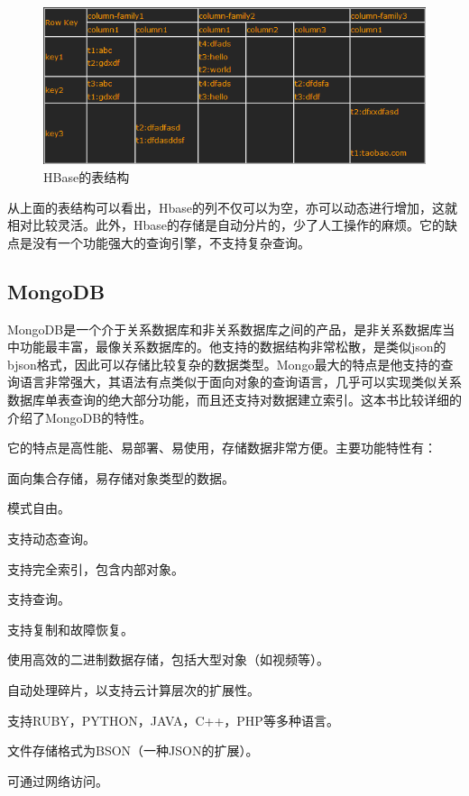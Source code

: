 \begin{figure}[!ht]
\centering
\includegraphics[]{photo/hbaseTable.PNG} 
\caption{HBase的表结构}
\end{figure} 

  从上面的表结构可以看出，Hbase的列不仅可以为空，亦可以动态进行增加，这就相对比较灵活。此外，Hbase的存储是自动分片的，少了人工操作的麻烦。它的缺点是没有一个功能强大的查询引擎，不支持复杂查询。

\subsection{MongoDB}
MongoDB是一个介于关系数据库和非关系数据库之间的产品，是非关系数据库当中功能最丰富，最像关系数据库的。他支持的数据结构非常松散，是类似json的bjson格式，因此可以存储比较复杂的数据类型。Mongo最大的特点是他支持的查询语言非常强大，其语法有点类似于面向对象的查询语言，几乎可以实现类似关系数据库单表查询的绝大部分功能，而且还支持对数据建立索引。\cite{MongoDBGuide}这本书比较详细的介绍了MongoDB的特性。

它的特点是高性能、易部署、易使用，存储数据非常方便。主要功能特性有：
\begin{compactitem}
\item 面向集合存储，易存储对象类型的数据。
\item 模式自由。
\item 支持动态查询。
\item 支持完全索引，包含内部对象。
\item 支持查询。
\item 支持复制和故障恢复。
\item 使用高效的二进制数据存储，包括大型对象（如视频等）。
\item 自动处理碎片，以支持云计算层次的扩展性。
\item 支持RUBY，PYTHON，JAVA，C++，PHP等多种语言。
\item 文件存储格式为BSON（一种JSON的扩展）。
\item 可通过网络访问。
\end{compactitem}

